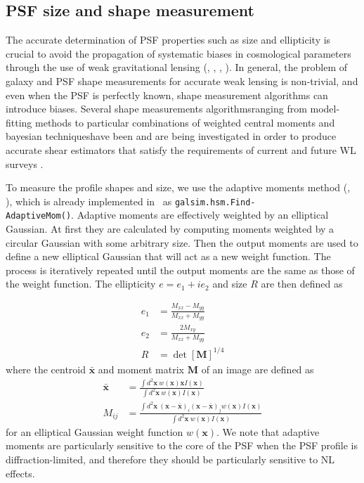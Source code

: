\documentclass[11pt,preprint,flushrt]{aastex}
\begin{document}
\subsection {PSF size and shape measurement}
The accurate determination of PSF properties such as size and ellipticity is crucial to avoid the propagation of systematic biases in cosmological parameters through the use of weak gravitational lensing (\citealt{paulin08}, \citealt{paulin09}, \citealt{massey13}, \citealt{cropper13}). In general, the problem of galaxy and PSF shape measurements for accurate weak lensing is non-trivial, and even when the PSF is perfectly known, shape measurement algorithms can introduce biases. Several shape measurements algorithms\textemdash ranging from model-fitting methods to particular combinations of weighted central moments and bayesian techniques\textemdash have been and are being investigated in order to produce accurate shear estimators that satisfy the requirements of current and future WL surveys \citep{mandelbaum15}.

To measure the profile shapes and size, we use the adaptive moments method (\citealt{bernstein02}, \citealt{hirata03}), which is already implemented in \gs\ as {\tt{galsim.hsm.Find-\\AdaptiveMom()}}. Adaptive moments are effectively weighted by an elliptical Gaussian. At first they are calculated by computing moments weighted by a circular Gaussian with some arbitrary size. Then the output moments are used to define a new elliptical Gaussian that will act as a new weight function. The process is iteratively repeated until the output moments are the same as those of the weight function. The ellipticity $e=e_1 + ie_2$ and size $R$ are then defined as

\begin{align}
e_1&=\frac{M_{xx} - M_{yy}}{M_{xx}+M_{yy}} \\
e_2&=\frac{2 M_{xy}}{M_{xx}+M_{yy}} \\
R&=\det[\mathbf{M}]^{1/4}
 \end{align}
where the centroid $\mathbf{\bar{x}}$ and moment matrix $\mathbf{M}$ of an image are defined as
\begin{align}
\mathbf{\bar{x}}&=\frac{\int d^2\mathbf{x}\ w(\mathbf{x}) \mathbf{x} I(\mathbf{x})}{\int d^2 \mathbf{x}\ w(\mathbf{x})I(\mathbf{x})} \\
M_{ij}&=\frac{\int d^2\mathbf{x}\ (\mathbf{x} - \mathbf{\bar{x}})_i  (\mathbf{x} - \mathbf{\bar{x}})_j w(\mathbf{x}) I(\mathbf{x})} {\int d^2\mathbf{x}\ w(\mathbf{x})I(\mathbf{x})}
\end{align}
for an elliptical Gaussian weight function $w(\mathbf{x})$. 
We note that adaptive moments are particularly sensitive to the core of the PSF when the PSF profile is diffraction-limited, and therefore they should be particularly sensitive to NL effects.
\end{document}
